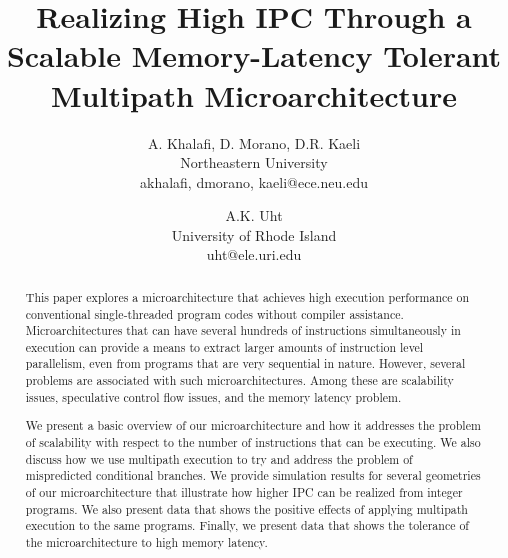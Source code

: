 \documentclass[10pt,dvips]{article}
\begin{document}
\parskip 2mm
%
%
\title{Realizing High IPC Through a Scalable Memory-Latency Tolerant
Multipath Microarchitecture}
%
\author{
A. Khalafi, D. Morano, D.R. Kaeli\\
Northeastern University\\
{akhalafi, dmorano, kaeli}@ece.neu.edu\\
\and
A.K. Uht \\
University of Rhode Island\\ uht@ele.uri.edu
}
%
\maketitle
\thispagestyle{empty}
%
\begin{abstract}
This paper explores a microarchitecture that achieves high execution
performance on conventional single-threaded program codes without
compiler assistance.  Microarchitectures that can have several hundreds
of instructions simultaneously in execution can provide a means to extract
larger amounts of instruction level parallelism, even from programs
that are very sequential in nature.  However, several problems are
associated with such microarchitectures.
Among these are scalability issues, speculative
control flow issues, and the memory latency problem.

We present a basic overview of our microarchitecture and how it
addresses the problem of scalability with respect to the
number of instructions that can be executing.  We also discuss how we use
multipath execution to try and address the problem of mispredicted
conditional branches.  We provide simulation results for several
geometries of our microarchitecture that illustrate how higher IPC
can be realized from integer programs.  We also present
data that shows the positive effects of applying multipath execution to
the same programs.  Finally, we present data that shows the
tolerance of the microarchitecture to
high memory latency.
\end{abstract}
%
\end{document}
